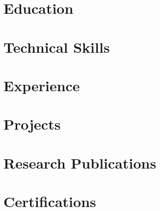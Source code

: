 \documentclass[letter,10pt]{article}
\def\website{vinay-ram1999.github.io}
\begin{document}


\section{Education}


\section{Technical Skills}


\section{Experience}


%

\section{Projects}


\section{Research Publications}



\section{Certifications}



\createfootnote
\end{document}
